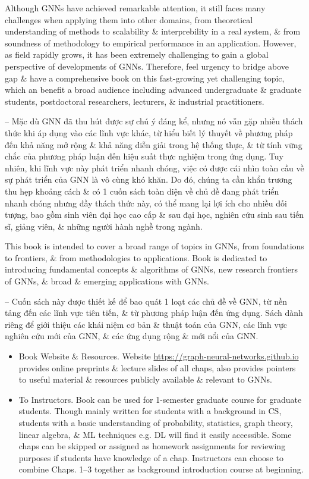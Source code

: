 \documentclass{article}
\begin{document}
\begin{itemize}
    Although GNNs have achieved remarkable attention, it still faces many challenges when applying them into other domains, from theoretical understanding of methods to scalability \& interprebility in a real system, \& from soundness of methodology to empirical performance in an application. However, as field rapidly grows, it has been extremely challenging to gain a global perspective of developments of GNNs. Therefore, feel urgency to bridge above gap \& have a comprehensive book on this fast-growing yet challenging topic, which an benefit a broad audience including advanced undergraduate \& graduate students, postdoctoral researchers, lecturers, \& industrial practitioners.

    -- Mặc dù GNN đã thu hút được sự chú ý đáng kể, nhưng nó vẫn gặp nhiều thách thức khi áp dụng vào các lĩnh vực khác, từ hiểu biết lý thuyết về phương pháp đến khả năng mở rộng \& khả năng diễn giải trong hệ thống thực, \& từ tính vững chắc của phương pháp luận đến hiệu suất thực nghiệm trong ứng dụng. Tuy nhiên, khi lĩnh vực này phát triển nhanh chóng, việc có được cái nhìn toàn cầu về sự phát triển của GNN là vô cùng khó khăn. Do đó, chúng ta cần khẩn trương thu hẹp khoảng cách \& có 1 cuốn sách toàn diện về chủ đề đang phát triển nhanh chóng nhưng đầy thách thức này, có thể mang lại lợi ích cho nhiều đối tượng, bao gồm sinh viên đại học cao cấp \& sau đại học, nghiên cứu sinh sau tiến sĩ, giảng viên, \& những người hành nghề trong ngành.

    This book is intended to cover a broad range of topics in GNNs, from foundations to frontiers, \& from methodologies to applications. Book is dedicated to introducing fundamental concepts \& algorithms of GNNs, new research frontiers of GNNs, \& broad \& emerging applications with GNNs.

    -- Cuốn sách này được thiết kế để bao quát 1 loạt các chủ đề về GNN, từ nền tảng đến các lĩnh vực tiên tiến, \& từ phương pháp luận đến ứng dụng. Sách dành riêng để giới thiệu các khái niệm cơ bản \& thuật toán của GNN, các lĩnh vực nghiên cứu mới của GNN, \& các ứng dụng rộng \& mới nổi của GNN.
    \begin{itemize}
        \item {\sf Book Website \& Resources.} Website \url{https://graph-neural-networks.github.io} provides online preprints \& lecture slides of all chaps, also provides pointers to useful material \& resources publicly available \& relevant to GNNs.
        \item {\sf To Instructors.} Book can be used for 1-semester graduate course for graduate students. Though mainly written for students with a background in CS, students with a basic understanding of probability, statistics, graph theory, linear algebra, \& ML techniques e.g. DL will find it easily accessible. Some chaps can be skipped or assigned as homework assignments for reviewing purposes if students have knowledge of a chap. Instructors can choose to combine Chaps. 1--3 together as background introduction course at beginning.


\end{itemize}
\end{itemize}
\end{document}
